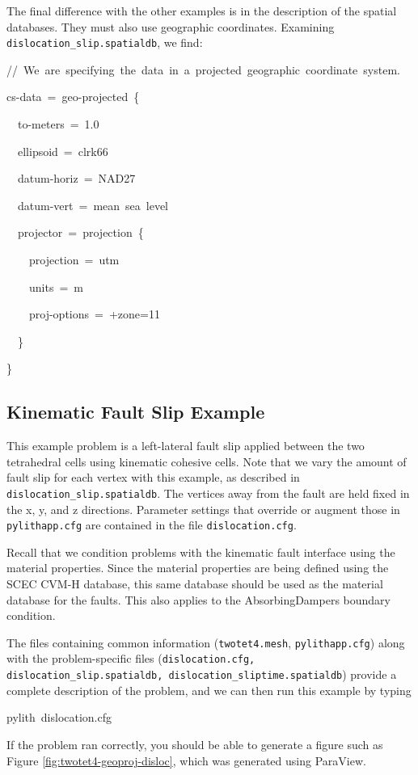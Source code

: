 The final difference with the other examples is in the description
of the spatial databases. They must also use geographic coordinates.
Examining \texttt{dislocation\_slip.spatialdb}, we find:
\begin{lyxcode}
//~We~are~specifying~the~data~in~a~projected~geographic~coordinate~system.

cs-data~=~geo-projected~\{

~~to-meters~=~1.0

~~ellipsoid~=~clrk66

~~datum-horiz~=~NAD27

~~datum-vert~=~mean~sea~level

~~projector~=~projection~\{

~~~~projection~=~utm

~~~~units~=~m

~~~~proj-options~=~+zone=11

~~\}

\}
\end{lyxcode}

\subsection{Kinematic Fault Slip Example}

This example problem is a left-lateral fault slip applied between
the two tetrahedral cells using kinematic cohesive cells. Note that
we vary the amount of fault slip for each vertex with this example,
as described in \texttt{}~\linebreak{}
\texttt{dislocation\_slip.spatialdb}. The vertices away from the fault
are held fixed in the x, y, and z directions. Parameter settings that
override or augment those in \texttt{pylithapp.cfg} are contained
in the file \texttt{dislocation.cfg}.

Recall that we condition problems with the kinematic fault interface
using the material properties. Since the material properties are being
defined using the SCEC CVM-H database, this same database should be
used as the material database for the faults. This also applies to
the AbsorbingDampers boundary condition.

The files containing common information (\texttt{twotet4.mesh}, \texttt{pylithapp.cfg})
along with the problem-specific files (\texttt{dislocation.cfg, dislocation\_slip.spatialdb,
dislocation\_sliptime.spatialdb}) provide a complete description of
the problem, and we can then run this example by typing
\begin{lyxcode}
pylith~dislocation.cfg
\end{lyxcode}
If the problem ran correctly, you should be able to generate a figure
such as Figure \vref{fig:twotet4-geoproj-disloc}, which was generated
using ParaView.

